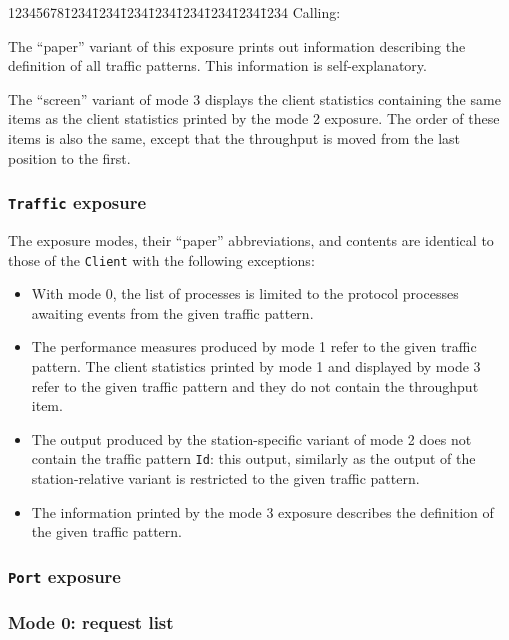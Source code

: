 {\tt\begin{tabbing}
12345678\=1234\=1234\=1234\=1234\=1234\=1234\=1234\=1234\kill
{\rm Calling:}
\end{tabbing}}

The ``paper'' variant of this exposure prints out information describing
the definition of all traffic patterns.
This information is self-explanatory.

The ``screen'' variant of mode 3 displays the client statistics
containing the same items as the client statistics printed by the mode 2
exposure.
The order of these items is also the same, except that the throughput
is moved from the last position to the first.

\subsubsection{{\tt Traffic} exposure}
\label{rm_ex_se_tr}

The exposure modes, their ``paper'' abbreviations, and contents are
identical to those of the {\tt Client} with the following exceptions:
\begin{itemize}
\item
With mode 0, the list of processes is limited to the protocol
processes awaiting events from the given traffic pattern.
\item
The performance measures produced by mode 1 refer to the
given traffic pattern.
The client statistics printed by mode 1 and displayed by mode 3 refer
to the given traffic pattern and they do not contain the throughput
item.
\item
The output produced by the
station-specific variant of mode 2 does not contain the traffic
pattern {\tt Id}: this output, similarly as the output of the
station-relative variant is restricted to the given traffic pattern.
\item
The information printed by the
mode 3 exposure describes the definition of the given traffic pattern.
\end{itemize}

\subsubsection{{\tt Port} exposure}
\label{rm_ex_se_po}

\subsubsection*{Mode 0: request list}

